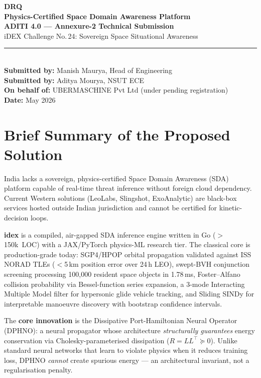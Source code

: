 \documentclass[11pt,a4paper]{article}
\begin{document}
\begin{center}
{\LARGE\bfseries\textsf{DRQ}}\\[0.3em]
{\large\textcolor{mitred}{\textbf{Physics-Certified Space Domain Awareness Platform}}}\\[1.2em]
{\normalsize\textbf{ADITI 4.0 --- Annexure-2 Technical Submission}}\\[0.3em]
{\normalsize iDEX Challenge No.\,24: Sovereign Space Situational Awareness}\\[1em]
\rule{0.6\textwidth}{0.5pt}\\[0.8em]
{\small\textbf{Submitted by:} Manish Maurya, Head of Engineering}\\
{\small\textbf{Submitted by:} Aditya Mourya, NSUT ECE}\\
{\small\textbf{On behalf of:} UBERMASCHINE Pvt Ltd (under pending registration)}\\
{\small\textbf{Date:} May 2026}
\end{center}

\vspace{1.5em}

\section{Brief Summary of the Proposed Solution}

India lacks a sovereign, physics-certified Space Domain Awareness (SDA) platform
capable of real-time threat inference without foreign cloud dependency.
Current Western solutions (LeoLabs, Slingshot, ExoAnalytic) are black-box
services hosted outside Indian jurisdiction and cannot be certified for
kinetic-decision loops.

\textbf{idex} is a compiled, air-gapped SDA inference engine written in Go
($>$150k~LOC) with a JAX/PyTorch physics-ML research tier.
The classical core is production-grade today: SGP4/HPOP orbital propagation
validated against ISS NORAD TLEs ($<$5\,km position error over 24\,h LEO),
swept-BVH conjunction screening processing 100,000 resident space objects
in 1.78\,ms, Foster--Alfano collision probability via Bessel-function series
expansion, a 3-mode Interacting Multiple Model filter for hypersonic glide
vehicle tracking, and Sliding SINDy for interpretable manoeuvre discovery
with bootstrap confidence intervals.

The \textbf{core innovation} is the Dissipative Port-Hamiltonian Neural
Operator (DPHNO): a neural propagator whose architecture \emph{structurally
guarantees} energy conservation via Cholesky-parameterised dissipation
($R = LL^\top \succeq 0$). Unlike standard neural networks that learn to
violate physics when it reduces training loss, DPHNO \emph{cannot} create
spurious energy --- an architectural invariant, not a regularisation penalty.
\end{document}

